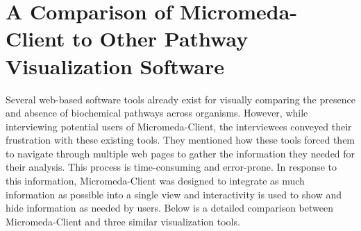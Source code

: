 \section{A Comparison of Micromeda-Client to Other Pathway Visualization 
Software} \label{visualization-comparison}

Several web-based software tools already exist for visually comparing the 
presence and absence of biochemical pathways across organisms. However, while 
interviewing potential users of Micromeda-Client, the interviewees conveyed 
their frustration with these existing tools. They mentioned how these tools 
forced them to navigate through multiple web pages to gather the information 
they needed for their analysis. This process is time-consuming and error-prone. 
In response to this information, Micromeda-Client was designed to integrate as 
much information as possible into a single view and interactivity is used to 
show and hide information as needed by users. Below is a detailed comparison 
between Micromeda-Client and three similar visualization tools.

